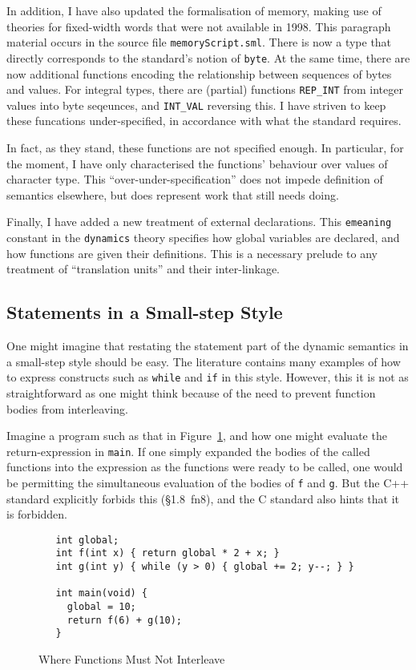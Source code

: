 \documentclass[11pt]{article}
\newcommand{\cpp}{\mbox{C\hspace{-0.5pt}+\hspace{-1.5pt}+}}
\begin{document}
In addition, I have also updated the formalisation of memory, making
use of theories for fixed-width words that were not available in 1998.
This paragraph material occurs in the source file
\texttt{memoryScript.sml}. There is now a type that directly
corresponds to the standard's notion of \texttt{byte}.  At the same
time, there are now additional functions encoding the relationship
between sequences of bytes and values.  For integral types, there are
(partial) functions \texttt{REP\_INT} from integer values into byte
seqeunces, and \texttt{INT\_VAL} reversing this.  I have striven to
keep these funcations under-specified, in accordance with what the
standard requires.

In fact, as they stand, these functions are not specified enough.  In
particular, for the moment, I have only characterised the functions'
behaviour over values of character type.  This
``over-under-specification'' does not impede definition of semantics
elsewhere, but does represent work that still needs doing.

Finally, I have added a new treatment of external declarations.  This
\texttt{emeaning} constant in the \texttt{dynamics} theory specifies
how global variables are declared, and how functions are given their
definitions.  This is a necessary prelude to any treatment of
``translation units'' and their inter-linkage.

\subsection{Statements in a Small-step Style}
\label{sec:small-step-stmts}

One might imagine that restating the statement part of the dynamic
semantics in a small-step style should be easy.  The literature
contains many examples of how to express constructs such as
\texttt{while} and \texttt{if} in this style.  However, this it is not
as straightforward as one might think because of the need to prevent
function bodies from interleaving.

Imagine a program such as that in Figure~\ref{fig:two-functions}, and
how one might evaluate the return-expression in \texttt{main}.  If one
simply expanded the bodies of the called functions into the expression
as the functions were ready to be called, one would be permitting the
simultaneous evaluation of the bodies of \texttt{f} and \texttt{g}.
But the \cpp{} standard explicitly forbids this (\S1.8~fn8), and the C
standard also hints that it is forbidden.
\begin{figure}[htbp]
\begin{verbatim}
   int global;
   int f(int x) { return global * 2 + x; }
   int g(int y) { while (y > 0) { global += 2; y--; } }

   int main(void) {
     global = 10;
     return f(6) + g(10);
   }
\end{verbatim}
\caption{Where Functions Must Not Interleave}
\label{fig:two-functions}
\end{figure}
\end{document}
